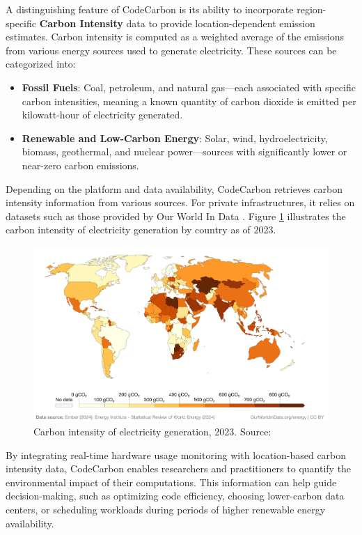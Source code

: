 \documentclass[a4paper,singleside,12pt]{report} %
\begin{document}
A distinguishing feature of CodeCarbon is its ability to incorporate region-specific \textbf{Carbon Intensity} data to provide 
location-dependent emission estimates. Carbon intensity is computed as a weighted average of the emissions from various energy 
sources used to generate electricity. These sources can be categorized into:
\begin{itemize}
    \item \textbf{Fossil Fuels}: Coal, petroleum, and natural gas—each associated with specific carbon intensities, meaning a known 
    quantity of carbon dioxide is emitted per kilowatt-hour of electricity generated.
    \item \textbf{Renewable and Low-Carbon Energy}: Solar, wind, hydroelectricity, biomass, geothermal, and nuclear power—sources 
    with significantly lower or near-zero carbon emissions.
\end{itemize}

Depending on the platform and data availability, CodeCarbon retrieves carbon intensity information from various sources. For private 
infrastructures, it relies on datasets such as those provided by Our World In Data \cite{ember2024carbonintensity}. Figure
\ref{fig:carbon_intensity} illustrates the carbon intensity of electricity generation by country as of 2023.

\begin{figure}
    \includegraphics[width=\linewidth]{imgs/carbon-intensity-electricity.png}
    \caption{Carbon intensity of electricity generation, 2023. Source: \cite{ember2024carbonintensity}}
    \label{fig:carbon_intensity}
\end{figure}

By integrating real-time hardware usage monitoring with location-based carbon intensity data, CodeCarbon enables researchers 
and practitioners to quantify the environmental impact of their computations. This information can help guide decision-making, 
such as optimizing code efficiency, choosing lower-carbon data centers, or scheduling workloads during periods of higher renewable 
energy availability.
\end{document}
